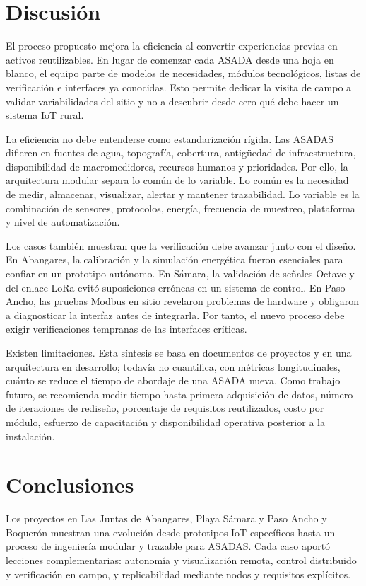 \documentclass[conference]{IEEEtran}
\begin{document}
\section{Discusión}
El proceso propuesto mejora la eficiencia al convertir experiencias previas en activos reutilizables. En lugar de comenzar cada ASADA desde una hoja en blanco, el equipo parte de modelos de necesidades, módulos tecnológicos, listas de verificación e interfaces ya conocidas. Esto permite dedicar la visita de campo a validar variabilidades del sitio y no a descubrir desde cero qué debe hacer un sistema IoT rural.

La eficiencia no debe entenderse como estandarización rígida. Las ASADAS difieren en fuentes de agua, topografía, cobertura, antigüedad de infraestructura, disponibilidad de macromedidores, recursos humanos y prioridades. Por ello, la arquitectura modular separa lo común de lo variable. Lo común es la necesidad de medir, almacenar, visualizar, alertar y mantener trazabilidad. Lo variable es la combinación de sensores, protocolos, energía, frecuencia de muestreo, plataforma y nivel de automatización.

Los casos también muestran que la verificación debe avanzar junto con el diseño. En Abangares, la calibración y la simulación energética fueron esenciales para confiar en un prototipo autónomo. En Sámara, la validación de señales Octave y del enlace LoRa evitó suposiciones erróneas en un sistema de control. En Paso Ancho, las pruebas Modbus en sitio revelaron problemas de hardware y obligaron a diagnosticar la interfaz antes de integrarla. Por tanto, el nuevo proceso debe exigir verificaciones tempranas de las interfaces críticas.

Existen limitaciones. Esta síntesis se basa en documentos de proyectos y en una arquitectura en desarrollo; todavía no cuantifica, con métricas longitudinales, cuánto se reduce el tiempo de abordaje de una ASADA nueva. Como trabajo futuro, se recomienda medir tiempo hasta primera adquisición de datos, número de iteraciones de rediseño, porcentaje de requisitos reutilizados, costo por módulo, esfuerzo de capacitación y disponibilidad operativa posterior a la instalación.

\section{Conclusiones}
Los proyectos en Las Juntas de Abangares, Playa Sámara y Paso Ancho y Boquerón muestran una evolución desde prototipos IoT específicos hasta un proceso de ingeniería modular y trazable para ASADAS. Cada caso aportó lecciones complementarias: autonomía y visualización remota, control distribuido y verificación en campo, y replicabilidad mediante nodos y requisitos explícitos.
\end{document}
